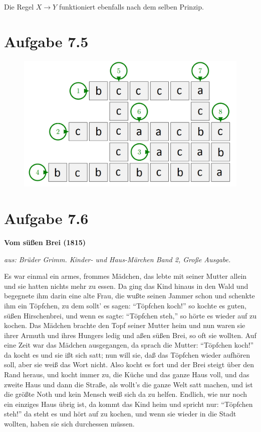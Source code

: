 \documentclass{article}
\begin{document}
Die Regel $X \rightarrow Y$ funktioniert ebenfalls nach dem selben Prinzip.


\section*{Aufgabe 7.5}
\begin{figure}[h]
  \includegraphics[scale=0.4]{crossword.png}
\end{figure}



\section*{Aufgabe 7.6}
\begin{center}
\textbf{Vom süßen Brei (1815)}

\textit{\footnotesize{aus: Brüder Grimm. Kinder- und Haus-Märchen Band 2, Große Ausgabe.}}
\end{center}
\begin{flushleft}\small
Es war einmal ein armes, frommes Mädchen, das lebte mit seiner Mutter allein und sie hatten nichts mehr zu essen. Da ging das Kind hinaus in den Wald und begegnete ihm darin eine alte Frau, die wußte seinen Jammer schon und schenkte ihm ein Töpfchen, zu dem sollt' es sagen: "`Töpfchen koch!"' so kochte es guten, süßen Hirschenbrei, und wenn es sagte: "`Töpfchen steh,"' so hörte es wieder auf zu kochen. Das Mädchen brachte den Topf seiner Mutter heim und nun waren sie ihrer Armuth und ihres Hungers ledig und aßen süßen Brei, so oft sie wollten. Auf eine Zeit war das Mädchen ausgegangen, da sprach die Mutter: "`Töpfchen koch!"' da kocht es und sie ißt sich satt; nun will sie, daß das Töpfchen wieder aufhören soll, aber sie weiß das Wort nicht. Also kocht es fort und der Brei steigt über den Rand heraus, und kocht immer zu, die Küche und das ganze Haus voll, und das zweite Haus und dann die Straße, als wollt’s die ganze Welt satt machen, und ist die größte Noth und kein Mensch weiß sich da zu helfen. Endlich, wie nur noch ein einziges Haus übrig ist, da kommt das Kind heim und spricht nur: "`Töpfchen steh!"' da steht es und hört auf zu kochen, und wenn sie wieder in die Stadt wollten, haben sie sich durchessen müssen.
\end{flushleft}
\end{document}
